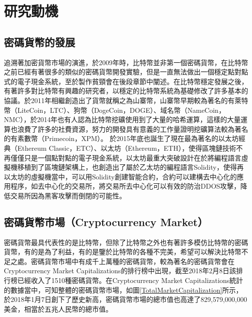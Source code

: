 
\chapter{研究動機}
	\section{密碼貨幣的發展}
	追溯著加密貨幣市場的演進，於2009年時，比特幣並非第一個密碼貨幣，在比特幣之前已經有著很多的類似的密碼貨幣開發實驗，但是一直無法做出一個穩定點對點式的電子現金系統，至於製作貧頸會在後段章節中闡述。在比特幣穩定發展之後，有著許多對比特幣有興趣的研究者，以穩定的比特幣系統為基礎修改了許多基本的協議。於2011年相繼創造出了貨幣就稱之為山寨幣，山寨幣早期較為著名的有萊特幣（LiteCoin，LTC）\supercite{litecoin}、狗幣（DogeCoin，DOGE）\supercite{dogecoin}、域名幣（NameCoin，NMC）\supercite{namecoin}，於2014年也有人認為比特幣挖礦使用到了大量的哈希運算，這樣的大量運算也浪費了許多的社費資源，努力的開發具有意義的工作量證明挖礦算法較為著名的有素數幣（Primecoin，XPM）\supercite{primecoin}。 於2015年底也誕生了現在最為著名的以太坊經典（Ethereum Classic，ETC）\supercite{ethereumclassic}、以太坊（Ethereum，ETH）\supercite{ethereum}，使得區塊鏈技術不再僅僅只是一個點對點的電子現金系統，以太坊最重大突破設計在於將編程語言虛擬機移植到了區塊鏈架構上，也創造出了屬於乙太坊的編程語言Solidity，使得再以太坊的虛擬機當中，可以用Solidity創建智能合約，合約可以建構去中心化的應用程序，如去中心化的交易所，將交易所去中心化可以有效的防治DDOS攻擊，降低交易所因為黑客攻擊而倒閉的可能性。

	\section{密碼貨幣市場（Cryptocurrency Market）}
	密碼貨幣最具代表性的是比特幣，但除了比特幣之外也有著許多模仿比特幣的密碼貨幣，有的是為了利益，有的是鑒於比特幣的各種不完美，希望可以解決比特幣不足之處。密碼貨幣市場中有成千上萬種的密碼貨幣，較為著名的密碼貨幣會在Cryptocurrency Market Capitalizations\supercite{CryptocurrencyMarketCapitalizations}的排行榜中出現，截至2018年2月8日該排行榜已經收入了1510種密碼貨幣。在Cryptocurrency Market Capitalizations統計的數據當中，可知整體的密碼貨幣市場，如圖\ref{TotalMarketCapitalization}所示，於2018年1月7日創下了歷史新高，密碼貨幣市場的總市值也高達了829,579,000,000美金，相當於五兆人民幣的總市值。


